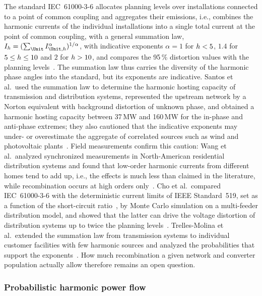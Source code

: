 The standard IEC~61000-3-6 allocates planning levels over installations connected to a point of common coupling and aggregates their emissions, i.e., combines the harmonic currents of the individual installations into a single total current at the point of common coupling, with a general summation law, $I_{\Harmonic} = (\sum_{\Unit} I_{\Unit,\Harmonic}^{\alpha})^{1/\alpha}$, with indicative exponents $\alpha = 1$ for $h < 5$, $1.4$ for $5 \leq h \leq 10$ and $2$ for $h > 10$, and compares the 95\,\% distortion values with the planning levels~\cite{noauthor_iec61000-3-6_2008}. The summation law thus carries the diversity of the harmonic phase angles into the standard, but its exponents are indicative. Santos et al.\ used the summation law to determine the harmonic hosting capacity of transmission and distribution systems, represented the upstream network by a Norton equivalent with background distortion of unknown phase, and obtained a harmonic hosting capacity between 37\,MW and 160\,MW for the in-phase and anti-phase extremes; they also cautioned that the indicative exponents may under- or overestimate the aggregate of correlated sources such as wind and photovoltaic plants~\cite{santos_considerations_2015}. Field measurements confirm this caution: Wang et al.\ analyzed synchronized measurements in North-American residential distribution systems and found that low-order harmonic currents from different homes tend to add up, i.e., the effects is much less than claimed in the literature, while recombination occurs at high orders only~\cite{wang_characteristics_2017}. Cho et al.\ compared IEC~61000-3-6 with the deterministic current limits of IEEE Standard~519, set as a function of the short-circuit ratio~\cite{noauthor_ieee519_2022}, by Monte Carlo simulation on a multi-feeder distribution model, and showed that the latter can drive the voltage distortion of distribution systems up to twice the planning levels~\cite{cho_analysis_2019}. Trelles-Molina et al.\ extended the summation law from transmission systems to individual customer facilities with few harmonic sources and analyzed the probabilities that support the exponents~\cite{trellesmolina_extension_2022}. How much recombination a given network and converter population actually allow therefore remains an open question.

\subsubsection{Probabilistic harmonic power flow}

